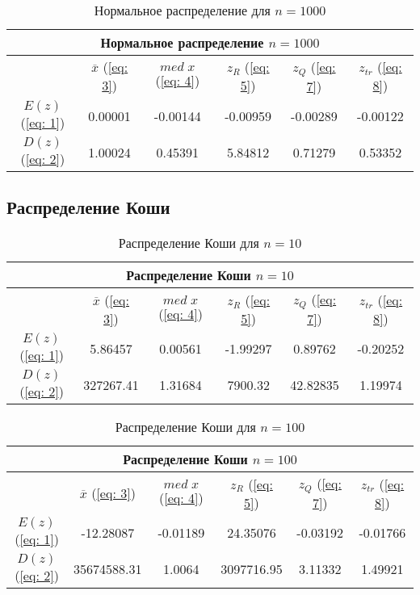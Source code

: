 \documentclass{article}
\begin{document}
\begin{table}[hb]
\begin{center}
\begin{tabular}{|c|c|c|c|c|c|}
\hline 
\multicolumn{6}{|c|}{Нормальное распределение $n=1000$} \\ 
\hline 
  & $\overline{x}$ (\ref{eq: 3}) & $med \; x$ (\ref{eq: 4}) & $z_R$ (\ref{eq: 5}) & $z_Q$ (\ref{eq: 7}) & $z_{tr}$ (\ref{eq: 8}) \\ 
\hline 
$E(z)$ (\ref{eq: 1}) & 0.00001 & -0.00144 & -0.00959 & -0.00289 & -0.00122 \\ 
\hline 
$D(z)$ (\ref{eq: 2}) & 1.00024 & 0.45391 & 5.84812 & 0.71279 & 0.53352 \\ 
\hline 
\end{tabular} 
\caption{Нормальное распределение для $n=1000$}
\end{center}
\end{table}

\newpage
\subsection{Распределение Коши}

\begin{table}[hb]
\begin{center}
\begin{tabular}{|c|c|c|c|c|c|}
\hline 
\multicolumn{6}{|c|}{Распределение Коши $n=10$} \\ 
\hline 
  & $\overline{x}$ (\ref{eq: 3}) & $med \; x$ (\ref{eq: 4}) & $z_R$ (\ref{eq: 5}) & $z_Q$ (\ref{eq: 7}) & $z_{tr}$ (\ref{eq: 8}) \\ 
\hline 
$E(z)$ (\ref{eq: 1}) & 5.86457 & 0.00561 & -1.99297 & 0.89762 & -0.20252 \\ 
\hline 
$D(z)$ (\ref{eq: 2}) & 327267.41 & 1.31684 & 7900.32 & 42.82835 & 1.19974 \\ 
\hline 
\end{tabular} 
\caption{Распределение Коши для $n=10$}
\end{center}
\end{table}

\begin{table}[hb]
\begin{center}
\begin{tabular}{|c|c|c|c|c|c|}
\hline 
\multicolumn{6}{|c|}{Распределение Коши $n=100$} \\ 
\hline 
  & $\overline{x}$ (\ref{eq: 3}) & $med \; x$ (\ref{eq: 4}) & $z_R$ (\ref{eq: 5}) & $z_Q$ (\ref{eq: 7}) & $z_{tr}$ (\ref{eq: 8}) \\ 
\hline 
$E(z)$ (\ref{eq: 1}) & -12.28087 & -0.01189 & 24.35076 & -0.03192 & -0.01766 \\ 
\hline 
$D(z)$ (\ref{eq: 2}) & 35674588.31 & 1.0064 & 3097716.95 & 3.11332 & 1.49921 \\ 
\hline 
\end{tabular} 
\caption{Распределение Коши для $n=100$}
\end{center}
\end{table}
\end{document}
